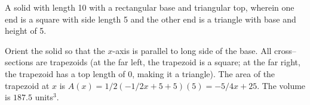 {A solid with length 10 with a rectangular base and triangular top, wherein one end is a square with side length 5 and the other end is a triangle with base and height of 5.

}
{Orient the solid so that the $x$-axis is parallel to long side of the base. All cross--sections are trapezoids (at the far left, the trapezoid is a square; at the far right, the trapezoid has a top length of 0, making it a triangle). The area of the trapezoid at $x$ is $A(x) = 1/2(-1/2x+5+5)(5) = -5/4x+25$. The volume is $187.5$ units$^3$.
}
